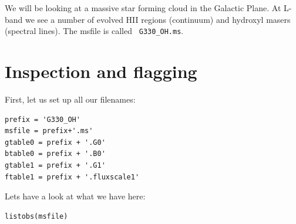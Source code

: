 \documentclass[force,almostfull,justified]{tufte-book}
\begin{document}
We will be looking at a massive star forming cloud in the Galactic Plane. At L-band we see a number of
evolved HII regions (continuum) and hydroxyl masers (spectral lines). The msfile is called {\tt
G330\_OH.ms}.

\section{Inspection and flagging}
First, let us set up all our filenames: \\
\begin{casacmd}
\begin{verbatim}
prefix = 'G330_OH'
msfile = prefix+'.ms'
gtable0 = prefix + '.G0'
btable0 = prefix + '.B0'
gtable1 = prefix + '.G1'
ftable1 = prefix + '.fluxscale1'
\end{verbatim}
\end{casacmd}

Lets have a look at what we have here: \\
\begin{casacmd}
\begin{verbatim}
listobs(msfile)
\end{verbatim}
\end{casacmd}
\end{document}
